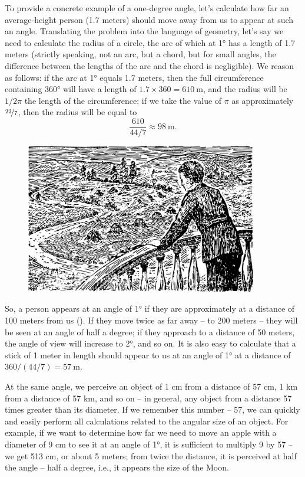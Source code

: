To provide a concrete example of a one-degree angle, let's calculate how far an average-height person (1.7 meters) should move away from us to appear at such an angle. Translating the problem into the language of geometry, let's say we need to calculate the radius of a circle, the arc of which at \ang{1} has a length of 1.7 meters (strictly speaking, not an arc, but a chord, but for small angles, the difference between the lengths of the arc and the chord is negligible). We reason as follows: if the arc at \ang{1} equals 1.7 meters, then the full circumference containing \ang{360} will have a length of $1.7 \times 360 = \SI{610}{\meter}$, and the radius will be $1/2\pi$ the length of the circumference; if we take the value of $\pi$ as approximately $\nicefrac{22}{7}$, then the radius will be equal to
\begin{equation*}%
 \frac{610}{44/7} \approx \SI{98}{\meter}.
\end{equation*}
\begin{figure}[h!]
\centering
\includegraphics[width=0.9\textwidth]{figures/ch-03/fig-062.pdf}
\end{figure}
So, a person appears at an angle of \ang{1} if they are approximately at a distance of 100 meters from us (). If they move twice as far away -- to 200 meters -- they will be seen at an angle of half a degree; if they approach to a distance of 50 meters, the angle of view will increase to \ang{2}, and so on. It is also easy to calculate that a stick of 1 meter in length should appear to us at an angle of 1° at a distance of $360/(44/7) = \SI{57}{\meter}$.

At the same angle, we perceive an object of 1 cm from a distance of 57 cm, 1 km from a distance of 57 km, and so on -- in general, any object from a distance 57 times greater than its diameter. If we remember this number -- 57, we can quickly and easily perform all calculations related to the angular size of an object. For example, if we want to determine how far we need to move an apple with a diameter of 9 cm to see it at an angle of \ang{1}, it is sufficient to multiply 9 by 57 -- we get 513 cm, or about 5 meters; from twice the distance, it is perceived at half the angle -- half a degree, i.e., it appears the size of the Moon.

